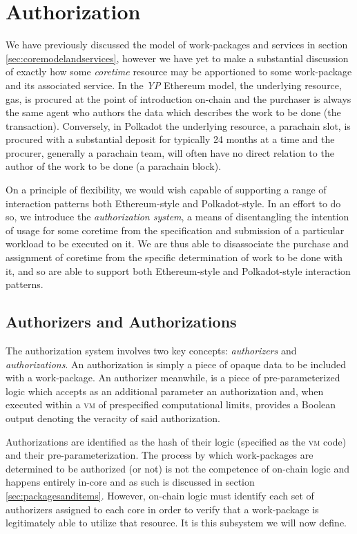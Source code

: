 \section{Authorization}\label{sec:authorization}

We have previously discussed the model of work-packages and services in section \ref{sec:coremodelandservices}, however we have yet to make a substantial discussion of exactly how some \emph{coretime} resource may be apportioned to some work-package and its associated service. In the \emph{YP} Ethereum model, the underlying resource, gas, is procured at the point of introduction on-chain and the purchaser is always the same agent who authors the data which describes the work to be done (\ie the transaction). Conversely, in Polkadot the underlying resource, a parachain slot, is procured with a substantial deposit for typically 24 months at a time and the procurer, generally a parachain team, will often have no direct relation to the author of the work to be done (\ie a parachain block).

On a principle of flexibility, we would wish \Jam capable of supporting a range of interaction patterns both Ethereum-style and Polkadot-style. In an effort to do so, we introduce the \emph{authorization system}, a means of disentangling the intention of usage for some coretime from the specification and submission of a particular workload to be executed on it. We are thus able to disassociate the purchase and assignment of coretime from the specific determination of work to be done with it, and so are able to support both Ethereum-style and Polkadot-style interaction patterns.

\subsection{Authorizers and Authorizations}

The authorization system involves two key concepts: \emph{authorizers} and \emph{authorizations}. An authorization is simply a piece of opaque data to be included with a work-package. An authorizer meanwhile, is a piece of pre-parameterized logic which accepts as an additional parameter an authorization and, when executed within a \textsc{vm} of prespecified computational limits, provides a Boolean output denoting the veracity of said authorization.

Authorizations are identified as the hash of their logic (specified as the \textsc{vm} code) and their pre-parameterization. The process by which work-packages are determined to be authorized (or not) is not the competence of on-chain logic and happens entirely in-core and as such is discussed in section \ref{sec:packagesanditems}. However, on-chain logic must identify each set of authorizers assigned to each core in order to verify that a work-package is legitimately able to utilize that resource. It is this subsystem we will now define.

